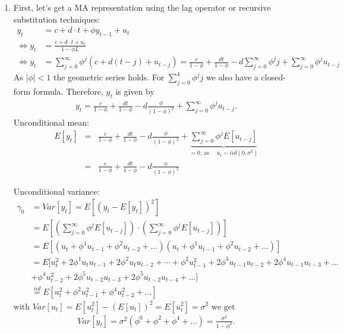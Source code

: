 \begin{enumerate}

\item
First, let's get a MA representation using the lag operator or recursive substitution techniques:
\begin{align*}
y_t &= c + d\cdot t + \phi y_{t-1} + u_t
\\
\Leftrightarrow y_t &= \frac{c + d\cdot t + u_t}{1-\phi L}
\\
\Leftrightarrow y_t &= \sum_{j=0}^{\infty}\phi^j(c+d(t-j)+u_{t-j}) = \frac{c}{1-\phi} + \frac{dt}{1-\phi} - d\sum_{j=0}^{\infty}\phi^j j + \sum_{j=0}^{\infty}\phi^j u_{t-j}
\end{align*}
As \( |\phi|<1 \) the geometric series holds.
For \(\sum_{j=0}^{k} \phi^j j\) we also have a closed-form formula.
Therefore, \(y_{t}\) is given by
\begin{align*}
y_{t} = \frac{c}{1-\phi} + \frac{dt}{1-\phi} - d \frac{\phi}{{(1-\phi)}^2}  + \sum_{j=0}^{\infty} \phi^j u_{t-j}.
\end{align*} 
Unconditional mean:
\begin{align*}
E[y_{t}] &=& \frac{c}{1-\phi} + \frac{dt}{1-\phi} - d \frac{\phi}{{(1-\phi)}^2} + \underbrace{\sum_{j=0}^{\infty} \phi^j E[u_{t-j}]}_{=0 \text{,~as~}\quad u_{t} \sim iid(0, \sigma^2)}
\\
&=& \frac{c}{1-\phi} + \frac{dt}{1-\phi} - d \frac{\phi}{{(1-\phi)}^2}
\end{align*}	

Unconditional variance:
\begin{align*}
\gamma_0 &= Var[y_{t}]
= E[{(y_{t} - E[y_{t}])}^2 ]
\\
&= E[(\sum_{j=0}^{\infty} \phi^j E[u_{t-j}]) \cdot (\sum_{j=0}^{\infty} \phi^j E[u_{t-j}])]
\\
&= E[(u_{t} + \phi^1 u_{t-1} + \phi^2 u_{t-2} + \dots)(u_{t} + \phi^1 u_{t-1} + \phi^2 u_{t-2} + \dots)]
\\
&= E[	u_{t}^2 + 2\phi^1 u_{t}u_{t-1} + 2\phi^2 u_{t}u_{t-2} + \cdots + 
\phi^2 u_{t-1}^2 + 2\phi^3 u_{t-1}u_{t-2} + 2\phi^4 u_{t-1}u_{t-3} + \dots
\\
&+ \phi^4 u_{t-2}^2 + 2\phi^5 u_{t-2}u_{t-3} + 2\phi^5 u_{t-2}u_{t-4} + \dots ]
\\
&\overset{iid}{=} E [ u_{t}^2+ \phi^2 u_{t-1}^2 + \phi^4 u_{t-2}^2 + \dots ]
\end{align*}
\(\text{with } Var[u_{t}] = E[u_{t}^2] - {(E[u_{t}])}^2 = E[u_{t}^2] = \sigma^2 \text{ we get}\)
\begin{align*}
Var[y_{t}] = \sigma^2 ( \phi^0 + \phi^2 + \phi^4 + \dots ) = \frac{\sigma^2}{1-\phi^2}.
\end{align*}


\end{enumerate}
